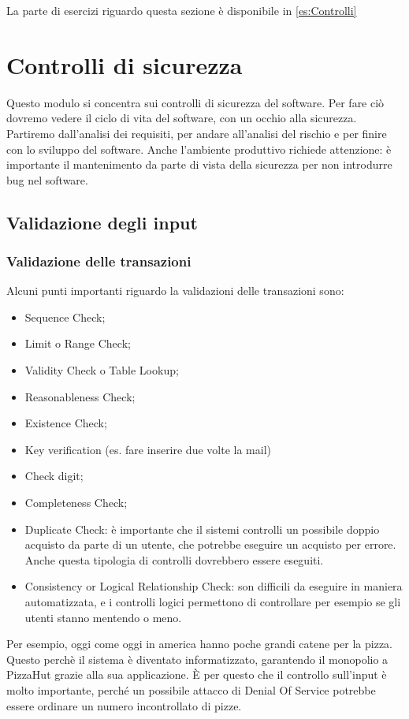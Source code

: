 La parte di esercizi riguardo questa sezione è disponibile in \ref{es:Controlli}

\part{Controlli di sicurezza}

Questo modulo si concentra sui controlli di sicurezza del software. Per fare ciò 
dovremo vedere il ciclo di vita del software, con un occhio alla sicurezza.
Partiremo dall'analisi dei requisiti, per andare all'analisi del rischio e per 
finire con lo sviluppo del software.
Anche l'ambiente produttivo richiede attenzione: è importante il mantenimento da 
parte di vista della sicurezza per non introdurre bug nel software.

\chapter{Validazione degli input}

\section{Validazione delle transazioni}

Alcuni punti importanti riguardo la validazioni delle transazioni sono:
\begin{itemize}
\item Sequence Check;
\item Limit o Range Check;
\item Validity Check o Table Lookup;
\item Reasonableness Check;
\item Existence Check;
\item Key verification (es. fare inserire due volte la mail)
\item Check digit;
\item Completeness Check;
\item Duplicate Check: è importante che il sistemi controlli un possibile doppio 
acquisto da parte di un utente, che potrebbe eseguire un acquisto per errore. 
Anche questa tipologia di controlli dovrebbero essere eseguiti.
\item Consistency or Logical Relationship Check: son difficili da eseguire in 
maniera automatizzata, e i controlli logici permettono di controllare per 
esempio se gli utenti stanno mentendo o meno. 
\end{itemize}

Per esempio, oggi come oggi in america hanno poche grandi catene per la pizza.
Questo perchè il sistema è diventato informatizzato, garantendo il monopolio a
PizzaHut grazie alla sua applicazione. È per questo che il controllo sull'input 
è molto importante, perché un possibile attacco di Denial Of Service potrebbe 
essere ordinare un numero incontrollato di pizze.